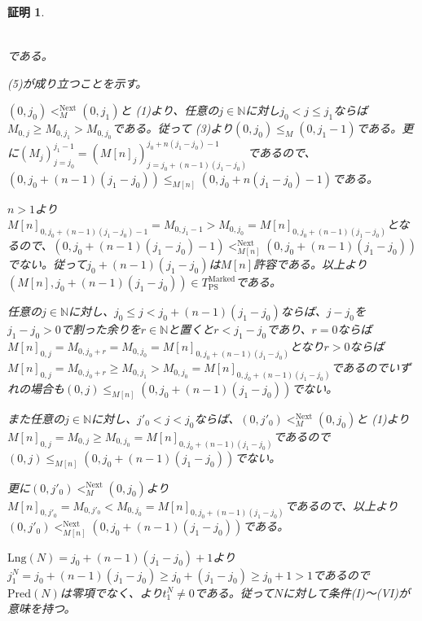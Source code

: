 \documentclass[dvipdfmx,uplatex]{jsarticle}
\theoremstyle{customnonumberbreakfortheorem}
\theoremstyle{customnonumberbreakforproof}
\newtheorem{hideableproof}{証明}
\begin{document}
\begin{hideableproof}
\begin{indented}
\begin{indented}
\begin{indented}
\begin{eqnarray*}
				\end{eqnarray*}
				\item である。
			\end{indented}
		\end{indented}
		\item
		\item (5)が成り立つことを示す。
	\end{indented}
	\((0,j_0) <_M^{\textrm{Next}} (0,j_1)\)と (1)より、任意の\(j \in \mathbb{N}\)に対し\(j_0 < j \leq j_1\)ならば\(M_{0,j} \geq M_{0,j_1} > M_{0,j_0}\)である。従って (3)より\((0,j_0) \leq_M (0,j_1-1)\)である。更に\((M_j)_{j=j_0}^{j_1-1} = (M[n]_j)_{j=j_0+(n-1)(j_1-j_0)}^{j_0+n(j_1-j_0)-1}\)であるので、\((0,j_0+(n-1)(j_1-j_0)) \leq_{M[n]} (0,j_0+n(j_1-j_0)-1)\)である。
	\begin{indented}
		\item \(n > 1\)より\(M[n]_{0,j_0+(n-1)(j_1-j_0)-1} = M_{0,j_1-1} > M_{0,j_0} = M[n]_{0,j_0+(n-1)(j_1-j_0)}\)となるので、\((0,j_0+(n-1)(j_1-j_0)-1) <_{M[n]}^{\textrm{Next}} (0,j_0+(n-1)(j_1-j_0))\)でない。従って\(j_0+(n-1)(j_1-j_0)\)は\(M[n]\)許容である。以上より\((M[n],j_0+(n-1)(j_1-j_0)) \in T_{\textrm{PS}}^{\textrm{Marked}}\)である。
		\item 任意の\(j \in \mathbb{N}\)に対し、\(j_0 \leq j < j_0+(n-1)(j_1-j_0)\)ならば、\(j-j_0\)を\(j_1-j_0 > 0\)で割った余りを\(r \in \mathbb{N}\)と置くと\(r < j_1-j_0\)であり、\(r = 0\)ならば\(M[n]_{0,j} = M_{0,j_0+r} = M_{0,j_0} = M[n]_{0,j_0+(n-1)(j_1-j_0)}\)となり\(r > 0\)ならば\(M[n]_{0,j} = M_{0,j_0+r} \geq M_{0,j_1} > M_{0,j_0} = M[n]_{0,j_0+(n-1)(j_1-j_0)}\)であるのでいずれの場合も\((0,j) \leq_{M[n]} (0,j_0+(n-1)(j_1-j_0))\)でない。
		\item また任意の\(j \in \mathbb{N}\)に対し、\(j'_0 < j < j_0\)ならば、\((0,j'_0) <_M^{\textrm{Next}} (0,j_0)\)と (1)より\(M[n]_{0,j} = M_{0,j} \geq M_{0,j_0} = M[n]_{0,j_0+(n-1)(j_1-j_0)}\)であるので\((0,j) \leq_{M[n]} (0,j_0+(n-1)(j_1-j_0))\)でない。
		\item 更に\((0,j'_0) <_M^{\textrm{Next}} (0,j_0)\)より\(M[n]_{0,j'_0} = M_{0,j'_0} < M_{0,j_0} = M[n]_{0,j_0+(n-1)(j_1-j_0)}\)であるので、以上より\((0,j'_0) <_{M[n]}^{\textrm{Next}} (0,j_0+(n-1)(j_1-j_0))\)である。
		\item \(\textrm{Lng}(N) = j_0+(n-1)(j_1-j_0)+1\)より\(j_1^N = j_0+(n-1)(j_1-j_0) \geq j_0 + (j_1-j_0) \geq j_0+1 > 1\)であるので\(\textrm{Pred}(N)\)は零項でなく、より\(t_1^N \neq 0\)である。従って\(N\)に対して条件(I)～(VI)が意味を持つ。

\end{indented}
\end{hideableproof}
\end{document}
